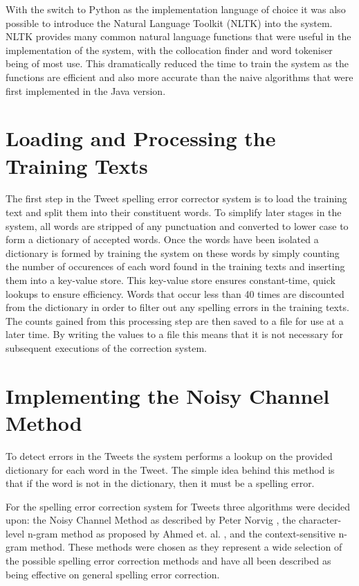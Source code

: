 With the switch to Python as the implementation language of choice it was also possible to introduce the Natural Language Toolkit (NLTK) \cite{} into the system. NLTK provides many common natural language functions that were useful in the implementation of the system, with the collocation finder and word tokeniser being of most use. This dramatically reduced the time to train the system as the functions are efficient and also more accurate than the naive algorithms that were first implemented in the Java version.

\section{Loading and Processing the Training Texts}
The first step in the Tweet spelling error corrector system is to load the training text and split them into their constituent words. To simplify later stages in the system, all words are stripped of any punctuation and converted to lower case to form a dictionary of accepted words. Once the words have been isolated a dictionary is formed by training the system on these words by simply counting the number of occurences of each word found in the training texts and inserting them into a key-value store. This key-value store ensures constant-time, quick lookups to ensure efficiency. Words that occur less than 40 times are discounted from the dictionary in order to filter out any spelling errors in the training texts. The counts gained from this processing step are then saved to a file for use at a later time. By writing the values to a file this means that it is not necessary for subsequent executions of the correction system.

\section{Implementing the Noisy Channel Method}
To detect errors in the Tweets the system performs a lookup on the provided dictionary for each word in the Tweet. The simple idea behind this method is that if the word is not in the dictionary, then it must be a spelling error.

For the spelling error correction system for Tweets three algorithms were decided upon: the Noisy Channel Method as described by Peter Norvig \cite{}, the character-level n-gram method as proposed by Ahmed et. al. \cite{}, and the context-sensitive n-gram method. These methods were chosen as they represent a wide selection of the possible spelling error correction methods and have all been described as being effective on general spelling error correction.

